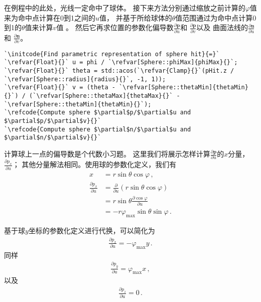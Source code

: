 在例程中的此处，光线一定命中了球体。
接下来方法分别通过缩放之前计算的$\varphi$值来为命中点计算在0到1之间的$u$值，
并基于所给球体的$\theta$值范围通过为命中点计算0到1的$\theta$值来计算$v$值
。
然后它再求位置的参数化偏导数$\displaystyle\frac{\partial \bm p}{\partial u}$和
$\displaystyle\frac{\partial \bm p}{\partial v}$以及
曲面法线的$\displaystyle\frac{\partial \bm n}{\partial u}$和
$\displaystyle\frac{\partial \bm n}{\partial v}$。
\begin{lstlisting}
`\initcode{Find parametric representation of sphere hit}{=}`
`\refvar{Float}{}` u = phi / `\refvar[Sphere::phiMax]{phiMax}{}`;
`\refvar{Float}{}` theta = std::acos(`\refvar{Clamp}{}`(pHit.z / `\refvar[Sphere::radius]{radius}{}`, -1, 1));
`\refvar{Float}{}` v = (theta - `\refvar[Sphere::thetaMin]{thetaMin}{}`) / (`\refvar[Sphere::thetaMax]{thetaMax}{}` - `\refvar[Sphere::thetaMin]{thetaMin}{}`);
`\refcode{Compute sphere $\partial$p/$\partial$u and $\partial$p/$\partial$v}{}`
`\refcode{Compute sphere $\partial$n/$\partial$u and $\partial$n/$\partial$v}{}`
\end{lstlisting}

计算球上一点的偏导数是个代数小习题。
这里我们将展示怎样计算$\displaystyle\frac{\partial \bm p}{\partial u}$的$x$分量，
$\displaystyle\frac{\partial p_x}{\partial u}$；
其他分量解法相同。使用球的参数化定义，我们有
\begin{align*}
    x                               & =r\sin\theta\cos\varphi\, ,                          \\
    \frac{\partial p_x}{\partial u} & =\frac{\partial}{\partial u}(r\sin\theta\cos\varphi) \\
                                    & =r\sin\theta\frac{\partial\cos\varphi}{\partial u}   \\
                                    & =-r\varphi_{\max}\sin\theta\sin\varphi\, .
\end{align*}

基于球$y$坐标的参数化定义进行代换，可以简化为
\begin{align*}
    \frac{\partial p_x}{\partial u}=-\varphi_{\max}y\, .
\end{align*}
同样
\begin{align*}
    \frac{\partial p_y}{\partial u}=\varphi_{\max}x\, ,
\end{align*}
以及
\begin{align*}
    \frac{\partial p_z}{\partial u}=0\, .
\end{align*}

